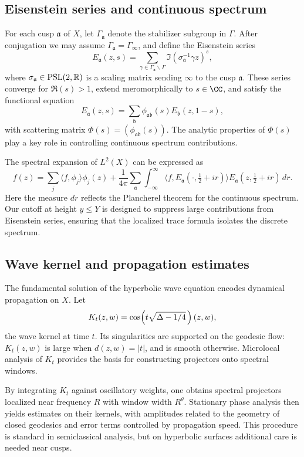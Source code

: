 \subsection{Eisenstein series and continuous spectrum}\label{subsec:eisenstein}

For each cusp $\mathfrak{a}$ of $X$, let $\Gamma_\mathfrak{a}$ denote the stabilizer subgroup in $\Gamma$. After conjugation we may assume $\Gamma_\mathfrak{a} = \Gamma_\infty$, and define the Eisenstein series
\[
E_\mathfrak{a}(z,s) = \sum_{\gamma \in \Gamma_\mathfrak{a}\backslash\Gamma} \Im(\sigma_\mathfrak{a}^{-1}\gamma z)^s,
\]
where $\sigma_\mathfrak{a} \in \mathrm{PSL}(2,\mathbb{R})$ is a scaling matrix sending $\infty$ to the cusp $\mathfrak{a}$. These series converge for $\Re(s)>1$, extend meromorphically to $s\in\CC$, and satisfy the functional equation
\[
E_\mathfrak{a}(z,s) = \sum_\mathfrak{b} \phi_{\mathfrak{a}\mathfrak{b}}(s) E_\mathfrak{b}(z,1-s),
\]
with scattering matrix $\Phi(s)=(\phi_{\mathfrak{a}\mathfrak{b}}(s))$. The analytic properties of $\Phi(s)$ play a key role in controlling continuous spectrum contributions.

The spectral expansion of $L^2(X)$ can be expressed as
\[
f(z) = \sum_j \langle f,\phi_j\rangle \phi_j(z) + \frac{1}{4\pi}\sum_\mathfrak{a} \int_{-\infty}^\infty \langle f, E_\mathfrak{a}(\cdot,\tfrac12+ir)\rangle E_\mathfrak{a}(z,\tfrac12+ir)\, dr.
\]
Here the measure $dr$ reflects the Plancherel theorem for the continuous spectrum. Our cutoff at height $y\le Y$ is designed to suppress large contributions from Eisenstein series, ensuring that the localized trace formula isolates the discrete spectrum.

\subsection{Wave kernel and propagation estimates}\label{subsec:wave}

The fundamental solution of the hyperbolic wave equation encodes dynamical propagation on $X$. Let
\[
K_t(z,w) = \cos\!\left(t \sqrt{\Delta - 1/4}\,\right)(z,w),
\]
the wave kernel at time $t$. Its singularities are supported on the geodesic flow: $K_t(z,w)$ is large when $d(z,w)=|t|$, and is smooth otherwise. Microlocal analysis of $K_t$ provides the basis for constructing projectors onto spectral windows.

By integrating $K_t$ against oscillatory weights, one obtains spectral projectors localized near frequency $R$ with window width $R^\theta$. Stationary phase analysis then yields estimates on their kernels, with amplitudes related to the geometry of closed geodesics and error terms controlled by propagation speed. This procedure is standard in semiclassical analysis, but on hyperbolic surfaces additional care is needed near cusps.


